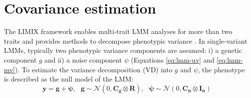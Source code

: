 \section{Covariance estimation}
The LIMIX framework enables multi-trait LMM analyses for more than two traits and provides methods to decompose phenotypic variance \citep{Lippert2014}. In single-variant LMMs, typically two phenotypic variance components are assumed: i) a genetic component \(g\) and ii) a noise component \(\psi\) (Equations \ref{eq:lmm-uv} and \ref{eq:lmm-mv}). 
\noindent To estimate the variance decomposition (VD) into \(g\) and \(\psi\), the phenotype is described as the null model of the LMM:
\begin{equation}
\mathbf{y} = \mathbf{g}+\boldsymbol{\psi},\text{ }
\mathbf{g}\sim
\mathcal{N}\left(0,
\mathbf{C_g} \otimes \mathbf{R}\right),\text{ }
 \mathbf{\psi}\sim
\mathcal{N}\left(0,\mathbf{C_n} \otimes \mathbf{I_n}\right)
\label{eq:vd}
\end{equation}



